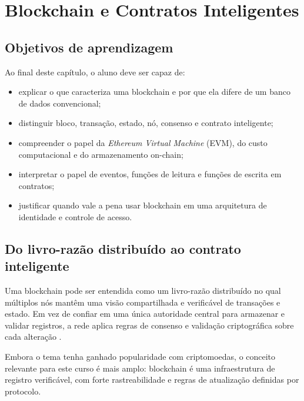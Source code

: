 \chapter{Blockchain e Contratos Inteligentes}
\label{chap:blockchain-contratos}

\section{Objetivos de aprendizagem}
Ao final deste capítulo, o aluno deve ser capaz de:
\begin{itemize}[leftmargin=*]
  \item explicar o que caracteriza uma blockchain e por que ela difere de um banco de dados convencional;
  \item distinguir bloco, transação, estado, nó, consenso e contrato inteligente;
  \item compreender o papel da \textit{Ethereum Virtual Machine} (EVM), do custo computacional e do armazenamento on-chain;
  \item interpretar o papel de eventos, funções de leitura e funções de escrita em contratos;
  \item justificar quando vale a pena usar blockchain em uma arquitetura de identidade e controle de acesso.
\end{itemize}
\section{Do livro-razão distribuído ao contrato inteligente}
Uma blockchain pode ser entendida como um livro-razão distribuído no qual múltiplos nós mantêm uma visão compartilhada e verificável de transações e estado. Em vez de confiar em uma única autoridade central para armazenar e validar registros, a rede aplica regras de consenso e validação criptográfica sobre cada alteração \citep{nakamoto_bitcoin,ethereum_whitepaper}.

Embora o tema tenha ganhado popularidade com criptomoedas, o conceito relevante para este curso é mais amplo: blockchain é uma infraestrutura de registro verificável, com forte rastreabilidade e regras de atualização definidas por protocolo.

